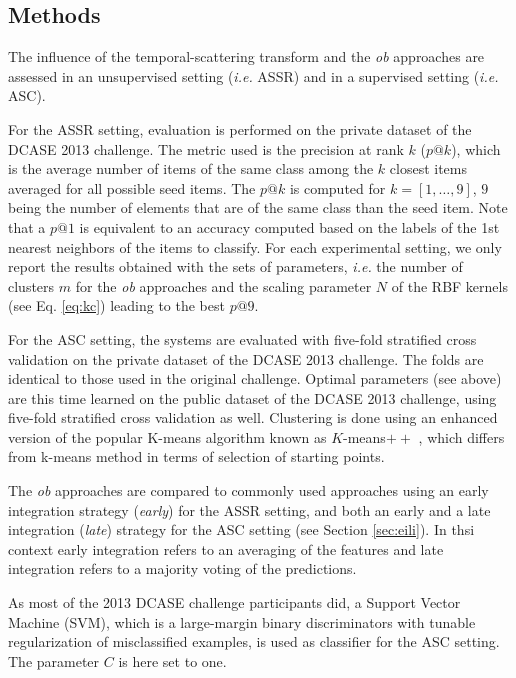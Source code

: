 \documentclass[journal]{IEEEtran}
\begin{document}
\subsection{Methods}

The influence of the temporal-scattering transform and the \emph{ob} approaches are assessed in an unsupervised setting (\emph{i.e.} ASSR) and in a supervised setting (\emph{i.e.} ASC). 

For the ASSR setting, evaluation is performed on the private dataset of the DCASE 2013 challenge. The metric used is the precision at rank $k$ ($p@k$), which is the  average  number  of  items  of  the  same  class among the $k$ closest items averaged for all possible seed items. The $p@k$ is computed for $k=[1,\ldots,9]$, $9$ being the number of elements that are of the same class than the seed item. Note that a $p@1$ is equivalent to an accuracy computed based on the labels of the 1st nearest neighbors of the items to classify. For each experimental setting, we only report the results obtained with the sets of parameters, \emph{i.e.} the number of clusters $m$ for the \emph{ob} approaches and the scaling parameter $N$ of the RBF kernels (see Eq. \ref{eq:kc}) leading to the best $p@9$.
 
For the ASC setting, the systems are evaluated  with five-fold  stratified cross validation on the private dataset of the DCASE 2013 challenge. The folds are identical to those used in the original challenge. Optimal parameters (see above) are this time learned on the public dataset of the DCASE 2013 challenge, using five-fold  stratified cross validation as well. Clustering is done using an enhanced version of the popular K-means algorithm known as $K$-means$++$ \cite{arthur2007k}, which differs from k-means method in terms of selection of starting points. 

The \emph{ob} approaches are compared to commonly used approaches using an early integration strategy (\emph{early}) for the ASSR setting, and both an early and a late integration (\emph{late}) strategy for the ASC setting (see Section \ref{sec:eili}). In thsi context early integration refers to an averaging of the features and late integration refers to a majority voting of the predictions.

As most of the 2013 DCASE challenge participants did, a Support Vector Machine (SVM), which is a large-margin binary discriminators with tunable regularization of misclassified examples, is used as classifier for the ASC setting. The parameter $C$ is here set to one.
\end{document}
